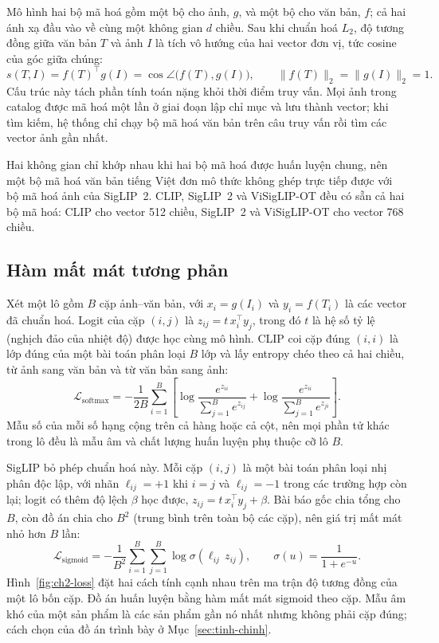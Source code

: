 Mô hình hai bộ mã hoá gồm một bộ cho ảnh, $g$, và một bộ cho văn bản, $f$; cả hai ánh xạ đầu vào về cùng một không gian $d$ chiều. Sau khi chuẩn hoá $L_2$, độ tương đồng giữa văn bản $T$ và ảnh $I$ là tích vô hướng của hai vector đơn vị, tức cosine của góc giữa chúng:
\begin{equation}
s(T,I)=f(T)^{\top}g(I)=\cos\angle\bigl(f(T),g(I)\bigr),\qquad \lVert f(T)\rVert_2=\lVert g(I)\rVert_2=1.
\label{eq:cosine}
\end{equation}
Cấu trúc này tách phần tính toán nặng khỏi thời điểm truy vấn. Mọi ảnh trong catalog được mã hoá một lần ở giai đoạn lập chỉ mục và lưu thành vector; khi tìm kiếm, hệ thống chỉ chạy bộ mã hoá văn bản trên câu truy vấn rồi tìm các vector ảnh gần nhất.

Hai không gian chỉ khớp nhau khi hai bộ mã hoá được huấn luyện chung, nên một bộ mã hoá văn bản tiếng Việt đơn mô thức không ghép trực tiếp được với bộ mã hoá ảnh của SigLIP~2. CLIP, SigLIP~2 và ViSigLIP-OT đều có sẵn cả hai bộ mã hoá: CLIP cho vector 512 chiều, SigLIP~2 và ViSigLIP-OT cho vector 768 chiều.

\subsection{Hàm mất mát tương phản}
\label{sec:ham-mat-mat}

Xét một lô gồm $B$ cặp ảnh--văn bản, với $x_i=g(I_i)$ và $y_i=f(T_i)$ là các vector đã chuẩn hoá. Logit của cặp $(i,j)$ là $z_{ij}=t\,x_i^{\top}y_j$, trong đó $t$ là hệ số tỷ lệ (nghịch đảo của nhiệt độ) được học cùng mô hình. CLIP coi cặp đúng $(i,i)$ là lớp đúng của một bài toán phân loại $B$ lớp và lấy entropy chéo theo cả hai chiều, từ ảnh sang văn bản và từ văn bản sang ảnh:
\begin{equation}
\mathcal{L}_{\mathrm{softmax}}=-\frac{1}{2B}\sum_{i=1}^{B}\left[\log\frac{e^{z_{ii}}}{\sum_{j=1}^{B}e^{z_{ij}}}+\log\frac{e^{z_{ii}}}{\sum_{j=1}^{B}e^{z_{ji}}}\right].
\label{eq:softmax}
\end{equation}
Mẫu số của mỗi số hạng cộng trên cả hàng hoặc cả cột, nên mọi phần tử khác trong lô đều là mẫu âm và chất lượng huấn luyện phụ thuộc cỡ lô $B$.

SigLIP bỏ phép chuẩn hoá này. Mỗi cặp $(i,j)$ là một bài toán phân loại nhị phân độc lập, với nhãn $\ell_{ij}=+1$ khi $i=j$ và $\ell_{ij}=-1$ trong các trường hợp còn lại; logit có thêm độ lệch $\beta$ học được, $z_{ij}=t\,x_i^{\top}y_j+\beta$. Bài báo gốc chia tổng cho $B$, còn đồ án chia cho $B^2$ (trung bình trên toàn bộ các cặp), nên giá trị mất mát nhỏ hơn $B$ lần:
\begin{equation}
\mathcal{L}_{\mathrm{sigmoid}}=-\frac{1}{B^{2}}\sum_{i=1}^{B}\sum_{j=1}^{B}\log\sigma\!\left(\ell_{ij}\,z_{ij}\right),\qquad \sigma(u)=\frac{1}{1+e^{-u}}.
\label{eq:sigmoid}
\end{equation}
Hình~\ref{fig:ch2-loss} đặt hai cách tính cạnh nhau trên ma trận độ tương đồng của một lô bốn cặp. Đồ án huấn luyện bằng hàm mất mát sigmoid theo cặp. Mẫu âm khó của một sản phẩm là các sản phẩm gần nó nhất nhưng không phải cặp đúng; cách chọn của đồ án trình bày ở Mục~\ref{sec:tinh-chinh}.

